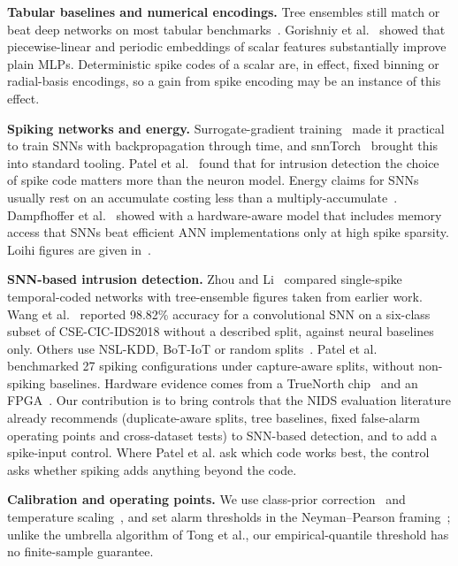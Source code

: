 \documentclass[conference]{IEEEtran}
\begin{document}
\textbf{Tabular baselines and numerical encodings.} Tree ensembles still match or beat deep networks on most tabular benchmarks~\cite{grinsztajn2022,shwartzziv2022}. Gorishniy et al.~\cite{gorishniy2022} showed that piecewise-linear and periodic embeddings of scalar features substantially improve plain MLPs. Deterministic spike codes of a scalar are, in effect, fixed binning or radial-basis encodings, so a gain from spike encoding may be an instance of this effect.

\textbf{Spiking networks and energy.} Surrogate-gradient training~\cite{neftci2019} made it practical to train SNNs with backpropagation through time, and snnTorch~\cite{eshraghian2023} brought this into standard tooling. Patel et al.~\cite{patel2026spiketiming} found that for intrusion detection the choice of spike code matters more than the neuron model. Energy claims for SNNs usually rest on an accumulate costing less than a multiply-accumulate~\cite{horowitz2014}. Dampfhoffer et al.~\cite{dampfhoffer2023} showed with a hardware-aware model that includes memory access that SNNs beat efficient ANN implementations only at high spike sparsity. Loihi figures are given in~\cite{davies2018,davies2021}.

\textbf{SNN-based intrusion detection.} Zhou and Li~\cite{zhou2021singlespike} compared single-spike temporal-coded networks with tree-ensemble figures taken from earlier work. Wang et al.~\cite{wang2024convsnn} reported 98.82\% accuracy for a convolutional SNN on a six-class subset of CSE-CIC-IDS2018 without a described split, against neural baselines only. Others use NSL-KDD, BoT-IoT or random splits~\cite{zivadinovic2024resource,fesu2025comparative,karthik2026hybrid}. Patel et al.~\cite{patel2026spiketiming} benchmarked 27 spiking configurations under capture-aware splits, without non-spiking baselines. Hardware evidence comes from a TrueNorth chip~\cite{alom2017truenorth} and an FPGA~\cite{mehrabi2024industrial}. Our contribution is to bring controls that the NIDS evaluation literature already recommends (duplicate-aware splits, tree baselines, fixed false-alarm operating points and cross-dataset tests) to SNN-based detection, and to add a spike-input control. Where Patel et al. ask which code works best, the control asks whether spiking adds anything beyond the code.

\textbf{Calibration and operating points.} We use class-prior correction~\cite{saerens2002} and temperature scaling~\cite{guo2017}, and set alarm thresholds in the Neyman--Pearson framing~\cite{tong2018}; unlike the umbrella algorithm of Tong et al., our empirical-quantile threshold has no finite-sample guarantee.
\end{document}
